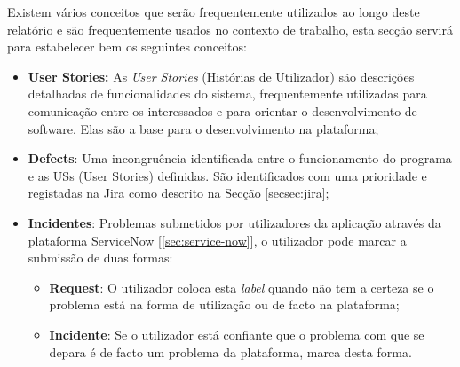         Existem vários conceitos que serão frequentemente utilizados ao longo deste relatório e são frequentemente usados no contexto de trabalho, esta secção servirá para estabelecer bem os seguintes conceitos:

        \begin{itemize}
            \item \textbf{User Stories:} As \textit{User Stories} (Histórias de Utilizador) são descrições detalhadas de funcionalidades do sistema, frequentemente utilizadas para comunicação entre os interessados e para orientar o desenvolvimento de software. Elas são a base para o desenvolvimento na plataforma;

            \item \textbf{Defects}\label{bulletlist:defects}: Uma incongruência identificada entre o funcionamento do programa e as USs (User Stories) definidas. São identificados com uma prioridade e registadas na Jira como descrito na Secção \ref{secsec:jira};
            
            \item \textbf{Incidentes}\label{bulletlist:incidentes}: Problemas submetidos por utilizadores da aplicação através da plataforma ServiceNow [\ref{sec:service-now}], o utilizador pode marcar a submissão de duas formas:
            \begin{itemize}
                \item \textbf{Request}: O utilizador coloca esta \textit{label} quando não tem a certeza se o problema está na forma de utilização ou de facto na plataforma;
                \item \textbf{Incidente}: Se o utilizador está confiante que o problema com que se depara é de facto um problema da plataforma, marca desta forma.
            \end{itemize}
                
            

\end{itemize}
